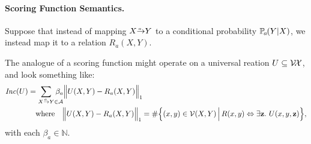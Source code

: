 \paragraph{Scoring Function Semantics.}
Suppose that instead of mapping $\ed aXY$ to a conditional probability
$\p_a(Y|X)$, we instead map it to a relation $R_a(X,Y)$. 

The analogue of a scoring function might operate
on a universal reation $U \subseteq \mathcal V\!\mathcal X$, and look something like:
\begin{align*}
    \Inc( U ) &= \sum_{\ed aXY \mathrlap{\in \Ar}} \beta_a 
        \Big\Vert U(X,Y) - R_a(X,Y) \Big\Vert_1
        \\
    &\quad\text{where}\quad
    \Big\Vert U(X,Y) - R_a(X,Y) \Big\Vert_1 = 
        \#\Big\{(x,y) \in \V(X,Y) \,\Big|\, R(x,y) \Leftrightarrow \exists\mat z.~ U(x,y,\mat z) \Big\},
\end{align*}
with each $\beta_a \in \mathbb N$. 

